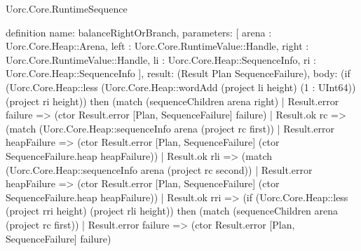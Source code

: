 \begin{lexlean}{Uorc.Core.RuntimeSequence}
\begin{semanticmodule}
definition{
  name: balanceRightOrBranch,
  parameters: [
    arena : Uorc.Core.Heap::Arena,
    left : Uorc.Core.RuntimeValue::Handle,
    right : Uorc.Core.RuntimeValue::Handle,
    li : Uorc.Core.Heap::SequenceInfo,
    ri : Uorc.Core.Heap::SequenceInfo
  ],
  result: (Result Plan SequenceFailure),
  body: (if (Uorc.Core.Heap::less (Uorc.Core.Heap::wordAdd (project li height) (1 : UInt64)) (project ri height)) then (match (sequenceChildren arena right)
    | Result.error failure => (ctor Result.error [Plan, SequenceFailure] failure)
    | Result.ok rc => (match (Uorc.Core.Heap::sequenceInfo arena (project rc first))
      | Result.error heapFailure => (ctor Result.error [Plan, SequenceFailure] (ctor SequenceFailure.heap heapFailure))
      | Result.ok rli => (match (Uorc.Core.Heap::sequenceInfo arena (project rc second))
        | Result.error heapFailure => (ctor Result.error [Plan, SequenceFailure] (ctor SequenceFailure.heap heapFailure))
        | Result.ok rri => (if (Uorc.Core.Heap::less (project rri height) (project rli height)) then (match (sequenceChildren arena (project rc first))
          | Result.error failure => (ctor Result.error [Plan, SequenceFailure] failure)
}
\end{semanticmodule}
\end{lexlean}
